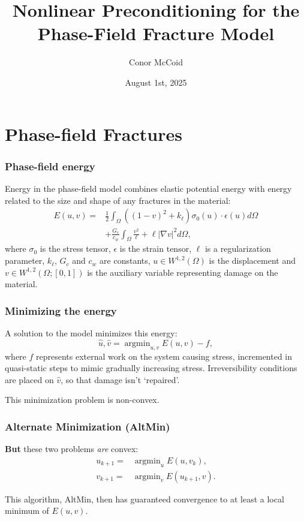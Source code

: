 \documentclass{beamer}
\title{Nonlinear Preconditioning for the Phase-Field Fracture Model}
\author{Conor McCoid}
\institute{McMaster University}
\date{August 1st, 2025}
\DeclareMathOperator*{\argmin}{argmin}
\begin{document}
\maketitle

\section{Phase-field Fractures}

\begin{frame}
\frametitle{Phase-field energy}

Energy in the phase-field model combines elastic potential energy with energy related to the size and shape of any fractures in the material:
\begin{align*}
E(u,v) = & \frac{1}{2} \int_\Omega \left ( (1-v)^2 + k_\ell \right ) \sigma_0(u) \cdot \epsilon(u) d\Omega \\
		& + \frac{G_c}{c_w} \int_\Omega \frac{v^2}{\ell} + \ell \lvert \nabla v \rvert^2 d\Omega,
\end{align*}
where $\sigma_0$ is the stress tensor, $\epsilon$ is the strain tensor, $\ell$ is a regularization parameter, $k_\ell$, $G_c$ and $c_w$ are constants, $u \in W^{1,2}(\Omega)$ is the displacement and $v \in W^{1,2}(\Omega; [0,1])$ is the auxiliary variable representing damage on the material.

\end{frame}

\begin{frame}
\frametitle{Minimizing the energy}

A solution to the model minimizes this energy:
\begin{equation*}
\hat{u}, \hat{v} = \argmin_{u,v} E(u,v) - f,
\end{equation*}
where $f$ represents external work on the system causing stress, incremented in quasi-static steps to mimic gradually increasing stress.
Irreversibility conditions are placed on $\hat{v}$, so that damage isn't `repaired'.

This minimization problem is non-convex.

\end{frame}

\begin{frame}
\frametitle{Alternate Minimization (AltMin)}

\textbf{But} these two problems \textit{are} convex:
\begin{align*}
	u_{k+1} = & \argmin_u E(u, v_k), \\ v_{k+1} = & \argmin_v E(u_{k+1}, v).
\end{align*}

This algorithm, AltMin, then has guaranteed convergence to at least a local minimum of $E(u,v)$.

\end{frame}
\end{document}
